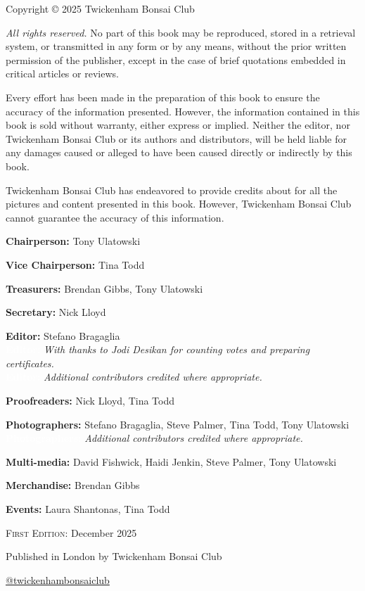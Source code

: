 \null
\vfill
\noindent
Copyright \copyright{} 2025 Twickenham Bonsai Club

\null
\noindent
\textit{All rights reserved.}
No part of this book may be reproduced, stored in a retrieval system, or transmitted in any form or by any means, without the prior written permission of the publisher, except in the case of brief quotations embedded in critical articles or reviews.

\noindent
Every effort has been made in the preparation of this book to ensure the accuracy of the information presented.
However, the information contained in this book is sold without warranty, either express or implied.
Neither the editor, nor Twickenham Bonsai Club or its authors and distributors, will be held liable for any damages caused or alleged to have been caused directly or indirectly by this book.

\noindent
Twickenham Bonsai Club has endeavored to provide credits about for all the pictures and content presented in this book.
However, Twickenham Bonsai Club cannot guarantee the accuracy of this information.

\null
\noindent
\textbf{Chairperson:} Tony Ulatowski

\noindent
\textbf{Vice Chairperson:} Tina Todd

\noindent
\textbf{Treasurers:} Brendan Gibbs, Tony Ulatowski

\noindent
\textbf{Secretary:} Nick Lloyd

\noindent
\textbf{Editor:} Stefano Bragaglia \\
\textbf{\textcolor{white}{Editor:}} \textit{With thanks to Jodi Desikan for counting votes and preparing certificates.}\\
\textbf{\textcolor{white}{Editor:}} \textit{Additional contributors credited where appropriate.}

\noindent
\textbf{Proofreaders:} Nick Lloyd, Tina Todd

\noindent
\textbf{Photographers:} Stefano Bragaglia, Steve Palmer, Tina Todd, Tony Ulatowski \\
\textbf{\textcolor{white}{Photographers:}} \textit{Additional contributors credited where appropriate.}

\noindent
\textbf{Multi\--media:} David Fishwick, Haidi Jenkin, Steve Palmer, Tony Ulatowski

\noindent
\textbf{Merchandise:} Brendan Gibbs

\noindent
\textbf{Events:} Laura Shantonas, Tina Todd

\null
\noindent
\textsc{First Edition:} December 2025

\null
\noindent
Published in London by Twickenham Bonsai Club

\null
\begin{center}
    \href{hhttps://www.instagram.com/twickenhambonsaiclub/}{@twickenham\-bonsai\-club}
\end{center}
